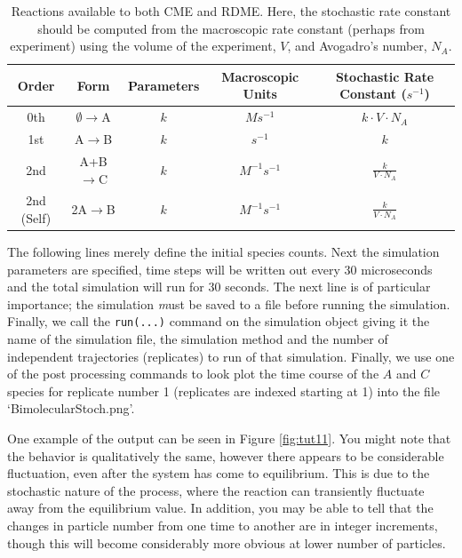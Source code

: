 \begin{table}[htdp]
\begin{center}
\begin{tabular}{|c|c|c|c|c|}
\hline
\textbf{Order} & \textbf{Form} & \textbf{Parameters} & \textbf{Macroscopic Units} & \textbf{Stochastic Rate Constant ($s^{-1}$)}\\
\hline\hline
0th  & $\emptyset\rightarrow$A  & $k$ & $Ms^{-1}$ & $k\cdot V \cdot N_A$\\
\hline
1st & A$\rightarrow$B & $k$ & $s^{-1}$ & $k$ \\
\hline
2nd & A+B$\rightarrow$C & $k$ & $M^{-1}s^{-1}$ & $\frac{k}{V\cdot N_A}$ \\
\hline
2nd (Self) & 2A$\rightarrow$B & $k$ & $M^{-1}s^{-1}$ & $\frac{k}{V\cdot N_A}$ \\
\hline
\end{tabular}
\end{center}
\caption{Reactions available to both CME and RDME.  Here, the stochastic rate constant should be computed from the macroscopic rate constant (perhaps from experiment) using the volume of the experiment, $V$, and Avogadro's number, $N_A$.} \label{tbl:rxnTypes}
\end{table}%

The following lines merely define the initial species counts.  Next the simulation parameters are specified, time steps will be written out every 30 microseconds and the total simulation will run for 30 seconds.  The next line is of particular importance; the simulation {\emph must} be saved to a file before running the simulation.  Finally, we call the \texttt{run(...)} command on the simulation object giving it the name of the simulation file, the simulation method and the number of independent trajectories (replicates) to run of that simulation.  Finally, we use one of the post processing commands to look plot the time course of the $A$ and $C$ species for replicate number 1 (replicates are indexed starting at 1) into the file `BimolecularStoch.png'.  




One example of the output can be seen in Figure \ref{fig:tut11}. You might note that the behavior is qualitatively the same, however there appears to be considerable fluctuation, even after the system has come to equilibrium.  This is due to the stochastic nature of the process, where the reaction can transiently fluctuate away from the equilibrium value.  In addition, you may be able to tell that the changes in particle number from one time to another are in integer increments, though this will become considerably more obvious at lower number of particles. \\


